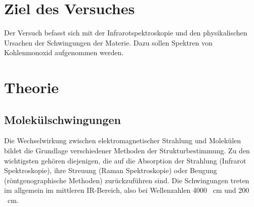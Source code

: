 \documentclass{article}
\begin{document}
\section{Ziel des Versuches}
Der Versuch befasst sich mit der Infrarotspektroskopie und den physikalischen Ursachen der Schwingungen der Materie.
Dazu sollen Spektren von Kohlenmonoxid aufgenommen werden.
\section {Theorie\supercite{fadini}}
\subsection{Molekülschwingungen}
Die Wechselwirkung zwischen elektromagnetischer Strahlung und Molekülen
bildet die Grundlage verschiedener Methoden der Strukturbestimmung. Zu den wichtigsten
gehören diejenigen, die auf die Absorption der Strahlung (Infrarot Spektroskopie),
ihre Streuung (Raman Spektroskopie) oder Beugung (röntgenographische Methoden)
zurückzuführen sind.
Die Schwingungen treten im allgemein im mittleren IR-Bereich,
also bei Wellenzahlen 4000 \si{\per\centi\meter} und 200 \si{\per\centi\meter}.
\end{document}
